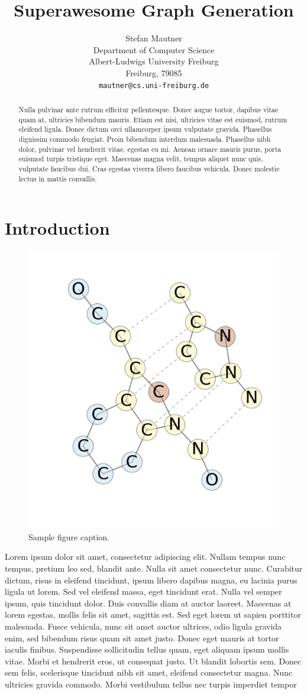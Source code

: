 \documentclass{article}
\title{Superawesome Graph Generation}
\author{
  Stefan Mautner\\
  Department of Computer Science\\
  Albert-Ludwigs University Freiburg\\
  Freiburg, 79085  \\
  \texttt{mautner@cs.uni-freiburg.de} \\
}
\begin{document}

\maketitle

\begin{abstract}
    \cite{rfam}Nulla pulvinar ante rutrum efficitur pellentesque. Donec augue tortor, dapibus vitae quam at, ultricies bibendum mauris. Etiam est nisi, ultricies vitae est euismod, rutrum eleifend ligula. Donec dictum orci ullamcorper ipsum vulputate gravida. Phasellus dignissim commodo feugiat. Proin bibendum interdum malesuada. Phasellus nibh dolor, pulvinar vel hendrerit vitae, egestas eu mi. Aenean ornare mauris purus, porta euismod turpis tristique eget. Maecenas magna velit, tempus aliquet nunc quis, vulputate faucibus dui. Cras egestas viverra libero faucibus vehicula. Donec molestie lectus in mattis convallis.
\end{abstract}
\section{Introduction}


% 
\begin{figure}[ht]
      \centering
        \includegraphics[width=0.2\linewidth]{images/cip.png}
      \caption{Sample figure caption.}
      \label{nazis}
\end{figure}

Lorem ipsum dolor sit amet, consectetur adipiscing elit. Nullam tempus nunc tempus, pretium leo sed, blandit ante. Nulla sit amet consectetur nunc. Curabitur dictum, risus in eleifend tincidunt, ipsum libero dapibus magna, eu lacinia purus ligula ut lorem. Sed vel eleifend massa, eget tincidunt erat. Nulla vel semper ipsum, quis tincidunt dolor. Duis convallis diam at auctor laoreet. Maecenas at lorem egestas, mollis felis sit amet, sagittis est. Sed eget lorem ut sapien porttitor malesuada. Fusce vehicula, nunc sit amet auctor ultrices, odio ligula gravida enim, sed bibendum risus quam sit amet justo. Donec eget mauris at tortor iaculis finibus. Suspendisse sollicitudin tellus quam, eget aliquam ipsum mollis vitae. Morbi et hendrerit eros, ut consequat justo. Ut blandit lobortis sem. Donec sem felis, scelerisque tincidunt nibh sit amet, eleifend consectetur magna. Nunc ultricies gravida commodo. Morbi vestibulum tellus nec turpis imperdiet tempor
\end{document}
